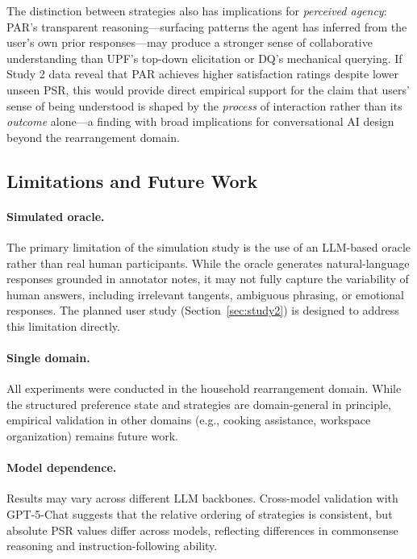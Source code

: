 \documentclass[manuscript,review,anonymous]{acmart}
\newcommand{\revend}{\color{black}}       %
\renewcommand{\revend}{}
\begin{document}
{The distinction between strategies also has implications for \textit{perceived agency}: PAR's transparent reasoning---surfacing patterns the agent has inferred from the user's own prior responses---may produce a stronger sense of collaborative understanding than UPF's top-down elicitation or DQ's mechanical querying. If Study 2 data reveal that PAR achieves higher satisfaction ratings despite lower unseen PSR, this would provide direct empirical support for the claim that users' sense of being understood is shaped by the \textit{process} of interaction rather than its \textit{outcome} alone---a finding with broad implications for conversational AI design beyond the rearrangement domain.

\subsection{Limitations and Future Work}

\paragraph{Simulated oracle.} The primary limitation of the simulation study is the use of an LLM-based oracle rather than real human participants. While the oracle generates natural-language responses grounded in annotator notes, it may not fully capture the variability of human answers, including irrelevant tangents, ambiguous phrasing, or emotional responses. The planned user study (Section~\ref{sec:study2}) is designed to address this limitation directly.

\paragraph{Single domain.} All experiments were conducted in the household rearrangement domain. While the structured preference state and strategies are domain-general in principle, empirical validation in other domains (e.g., cooking assistance, workspace organization) remains future work.

\paragraph{Model dependence.} Results may vary across different LLM backbones. Cross-model validation with GPT-5-Chat suggests that the relative ordering of strategies is consistent, but absolute PSR values differ across models, reflecting differences in commonsense reasoning and instruction-following ability.

\revend}
\end{document}
